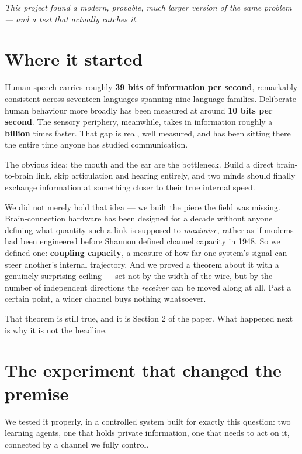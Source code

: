\documentclass[11pt]{article}
\begin{document}
\begin{pullquote}
\textit{This project found a modern, provable, much larger version of the same problem --- and a test that actually catches it.}
\end{pullquote}

\section{Where it started}

Human speech carries roughly \textbf{39 bits of information per second}, remarkably consistent across seventeen languages spanning nine language families. Deliberate human behaviour more broadly has been measured at around \textbf{10 bits per second}. The sensory periphery, meanwhile, takes in information roughly a \textbf{billion} times faster. That gap is real, well measured, and has been sitting there the entire time anyone has studied communication.

The obvious idea: the mouth and the ear are the bottleneck. Build a direct brain-to-brain link, skip articulation and hearing entirely, and two minds should finally exchange information at something closer to their true internal speed.

We did not merely hold that idea --- we built the piece the field was missing. Brain-connection hardware has been designed for a decade without anyone defining what quantity such a link is supposed to \emph{maximise}, rather as if modems had been engineered before Shannon defined channel capacity in 1948. So we defined one: \textbf{coupling capacity}, a measure of how far one system's signal can steer another's internal trajectory. And we proved a theorem about it with a genuinely surprising ceiling --- set not by the width of the wire, but by the number of independent directions the \emph{receiver} can be moved along at all. Past a certain point, a wider channel buys nothing whatsoever.

That theorem is still true, and it is Section 2 of the paper. What happened next is why it is not the headline.

\section{The experiment that changed the premise}

We tested it properly, in a controlled system built for exactly this question: two learning agents, one that holds private information, one that needs to act on it, connected by a channel we fully control.
\end{document}
